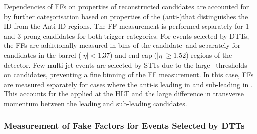 Dependencies of FFs on properties of reconstructed \tauhadvis candidates are
accounted for by further categorisation based on properties of the
(anti-)\tauhadvis that distinguishes the ID from the Anti-ID regions. The FF
measurement is performed separately for 1- and 3-prong \tauhadvis candidates for
both trigger categories. For events selected by DTTs, the FFs are additionally
measured in bins of the \tauhadvis candidate~\pT and separately for candidates
in the barrel ($|\eta| < 1.37$) and end-cap ($|\eta| \geq 1.52$) regions of the
detector. Few multi-jet events are selected by STTs due to the large
\pT~thresholds on \tauhadvis candidates, preventing a fine binning of the FF
measurement. In this case, FFs are measured separately for cases where the
anti-\tauhadvis is leading in \pT and sub-leading in \pT. This accounts for the
\tauid applied at the HLT and the large difference in transverse momentum
between the leading and sub-leading \tauhadvis candidates.


\subsubsection{Measurement of Fake Factors for Events Selected by DTTs}

